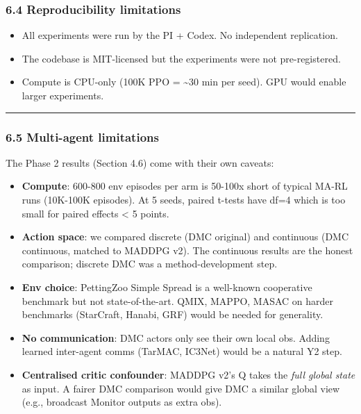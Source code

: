 \documentclass[
]{article}
\providecommand{\tightlist}{%
  \setlength{\itemsep}{0pt}\setlength{\parskip}{0pt}}
\begin{document}
\subsubsection{6.4 Reproducibility
limitations}\label{reproducibility-limitations}

\begin{itemize}
\tightlist
\item
  All experiments were run by the PI + Codex. No independent
  replication.
\item
  The codebase is MIT-licensed but the experiments were not
  pre-registered.
\item
  Compute is CPU-only (100K PPO = \textasciitilde30 min per seed). GPU
  would enable larger experiments.
\end{itemize}

\begin{center}\rule{0.5\linewidth}{0.5pt}\end{center}

\subsubsection{6.5 Multi-agent
limitations}\label{multi-agent-limitations}

The Phase 2 results (Section 4.6) come with their own caveats:

\begin{itemize}
\tightlist
\item
  \textbf{Compute}: 600-800 env episodes per arm is 50-100x short of
  typical MA-RL runs (10K-100K episodes). At 5 seeds, paired t-tests
  have df=4 which is too small for paired effects \textless{} 5 points.
\item
  \textbf{Action space}: we compared discrete (DMC original) and
  continuous (DMC continuous, matched to MADDPG v2). The continuous
  results are the honest comparison; discrete DMC was a
  method-development step.
\item
  \textbf{Env choice}: PettingZoo Simple Spread is a well-known
  cooperative benchmark but not state-of-the-art. QMIX, MAPPO, MASAC on
  harder benchmarks (StarCraft, Hanabi, GRF) would be needed for
  generality.
\item
  \textbf{No communication}: DMC actors only see their own local obs.
  Adding learned inter-agent comms (TarMAC, IC3Net) would be a natural
  Y2 step.
\item
  \textbf{Centralised critic confounder}: MADDPG v2's Q takes the
  \emph{full global state} as input. A fairer DMC comparison would give
  DMC a similar global view (e.g., broadcast Monitor outputs as extra
  obs).
\end{itemize}
\end{document}
